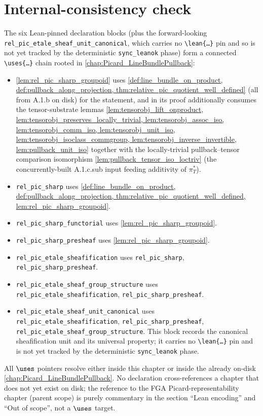 \section{Internal-consistency check}
\label{sec:relpic_consistency_check}

The six Lean-pinned declaration blocks (plus the forward-looking
\texttt{rel\_pic\_etale\_sheaf\_unit\_canonical}, which carries no
\texttt{\textbackslash lean\{\dots\}} pin and so is not yet tracked by
the deterministic \texttt{sync\_leanok} phase) form a connected
\texttt{\textbackslash uses\{\dots\}} chain rooted in
\cref{chap:Picard_LineBundlePullback}:
\begin{itemize}
  \item \cref{lem:rel_pic_sharp_groupoid} uses
    \cref{def:line_bundle_on_product, def:pullback_along_projection,
    thm:relative_pic_quotient_well_defined} (all from A.1.b on disk) for the
    statement, and in its proof additionally consumes the tensor-substrate
    lemmas \cref{lem:tensorobj_lift_onproduct,
    lem:tensorobj_preserves_locally_trivial, lem:tensorobj_assoc_iso,
    lem:tensorobj_comm_iso, lem:tensorobj_unit_iso,
    lem:tensorobj_isoclass_commgroup, lem:tensorobj_inverse_invertible,
    lem:pullback_unit_iso} together with the locally-trivial pullback--tensor
    comparison isomorphism \cref{lem:pullback_tensor_iso_loctriv} (the
    concurrently-built A.1.c.sub input feeding additivity of \(\pi_T^*\)).
  \item \texttt{rel\_pic\_sharp} uses
    \cref{def:line_bundle_on_product, def:pullback_along_projection,
    thm:relative_pic_quotient_well_defined, lem:rel_pic_sharp_groupoid}.
  \item \texttt{rel\_pic\_sharp\_functorial} uses
    \cref{lem:rel_pic_sharp_groupoid}.
  \item \texttt{rel\_pic\_sharp\_presheaf} uses
    \cref{lem:rel_pic_sharp_groupoid}.
  \item \texttt{rel\_pic\_etale\_sheafification} uses
    \texttt{rel\_pic\_sharp}, \texttt{rel\_pic\_sharp\_presheaf}.
  \item \texttt{rel\_pic\_etale\_sheaf\_group\_structure} uses
    \texttt{rel\_pic\_etale\_sheafification}, \texttt{rel\_pic\_sharp\_presheaf}.
  \item \texttt{rel\_pic\_etale\_sheaf\_unit\_canonical} uses
    \texttt{rel\_pic\_etale\_sheafification}, \texttt{rel\_pic\_sharp\_presheaf}, \texttt{rel\_pic\_etale\_sheaf\_group\_structure}. This block records the
    canonical sheafification unit and its universal property; it carries
    no \texttt{\textbackslash lean\{\dots\}} pin and is not yet tracked
    by the deterministic \texttt{sync\_leanok} phase.
\end{itemize}
All \(\uses\) pointers resolve either inside this chapter or inside the already
on-disk \cref{chap:Picard_LineBundlePullback}. No declaration cross-references
a chapter that does not yet exist on disk; the reference to
the FGA Picard-representability chapter (parent scope) is purely commentary in the section
``Lean encoding'' and ``Out of scope'', not a \(\uses\) target.
